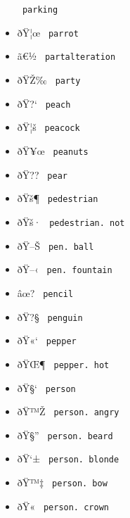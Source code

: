 \begin{itemize}
{  \texttt{\ parking\ }}
\item
  \label{symbol-parrot}{{ ðŸ¦œ } \texttt{\ parrot\ }}
\item
  \label{symbol-partalteration}{{ ã€½ }
  \texttt{\ partalteration\ }}
\item
  \label{symbol-party}{{ ðŸŽ‰ } \texttt{\ party\ }}
\item
  \label{symbol-peach}{{ ðŸ?{}` } \texttt{\ peach\ }}
\item
  \label{symbol-peacock}{{ ðŸ¦š } \texttt{\ peacock\ }}
\item
  \label{symbol-peanuts}{{ ðŸ¥œ } \texttt{\ peanuts\ }}
\item
  \label{symbol-pear}{{ ðŸ?? } \texttt{\ pear\ }}
\item
  \label{symbol-pedestrian}{{ ðŸš¶ }
  \texttt{\ pedestrian\ }}
\item
  \label{symbol-pedestrian.not}{{ ðŸš· }
  \texttt{\ pedestrian.\ not\ }}
\item
  \label{symbol-pen.ball}{{ ðŸ--Š }
  \texttt{\ pen.\ ball\ }}
\item
  \label{symbol-pen.fountain}{{ ðŸ--‹ }
  \texttt{\ pen.\ fountain\ }}
\item
  \label{symbol-pencil}{{ âœ? } \texttt{\ pencil\ }}
\item
  \label{symbol-penguin}{{ ðŸ?§ } \texttt{\ penguin\ }}
\item
  \label{symbol-pepper}{{ ðŸ«` } \texttt{\ pepper\ }}
\item
  \label{symbol-pepper.hot}{{ ðŸŒ¶ }
  \texttt{\ pepper.\ hot\ }}
\item
  \label{symbol-person}{{ ðŸ§` } \texttt{\ person\ }}
\item
  \label{symbol-person.angry}{{ ðŸ™Ž }
  \texttt{\ person.\ angry\ }}
\item
  \label{symbol-person.beard}{{ ðŸ§'' }
  \texttt{\ person.\ beard\ }}
\item
  \label{symbol-person.blonde}{{ ðŸ`± }
  \texttt{\ person.\ blonde\ }}
\item
  \label{symbol-person.bow}{{ ðŸ™‡ }
  \texttt{\ person.\ bow\ }}
\item
  \label{symbol-person.crown}{{ ðŸ« }
  \texttt{\ person.\ crown\ }}

\end{itemize}
